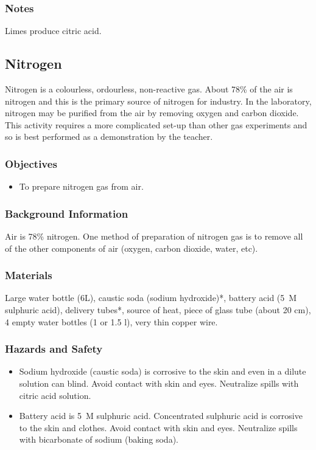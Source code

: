\subsubsection*{Notes}
Limes produce citric acid. 

\subsection{Nitrogen}

Nitrogen is a colourless, ordourless, non-reactive gas. About 78\% of the air is nitrogen and this is the primary source of nitrogen for industry. In the laboratory, nitrogen may be purified from the air by removing oxygen and carbon dioxide. This activity requires a more complicated set-up than other gas experiments and so is best performed as a demonstration by the teacher.

\subsubsection*{Objectives}
\begin{itemize}
\item{To prepare nitrogen gas from air.}
\end{itemize}

\subsubsection*{Background Information}
Air is 78\% nitrogen. One method of preparation of nitrogen gas is to remove all of the other components of air (oxygen, carbon dioxide, water, etc).

\subsubsection*{Materials}
Large water bottle (6L), caustic soda (sodium hydroxide)*, battery acid (5~M sulphuric acid), delivery tubes*, source of heat, piece of glass tube (about 20 cm), 4 empty water bottles (1 or 1.5 l), very thin copper wire.

\subsubsection*{Hazards and Safety}
\begin{itemize}
\item{Sodium hydroxide (caustic soda) is corrosive to the skin and even in a dilute solution can blind. Avoid contact with skin and eyes. Neutralize spills with citric acid solution.}
\item{Battery acid is 5~M sulphuric acid. Concentrated sulphuric acid is corrosive to the skin and clothes. Avoid contact with skin and eyes. Neutralize spills with bicarbonate of sodium (baking soda).}
\end{itemize}

